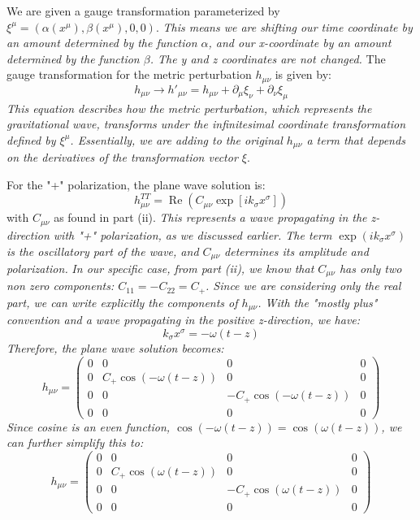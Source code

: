 \documentclass{article}
\begin{document}
We are given a gauge transformation parameterized by $\xi^{\mu} = (\alpha(x^{\mu}), \beta(x^{\mu}), 0, 0)$. \emph{This means we are shifting our time coordinate by an amount determined by the function $\alpha$, and our x-coordinate by an amount determined by the function $\beta$. The y and z coordinates are not changed.} The gauge transformation for the metric perturbation $h_{\mu \nu}$ is given by:
\begin{equation}
h_{\mu \nu} \to h'_{\mu\nu} = h_{\mu \nu} + \partial_{\mu} \xi_{\nu} + \partial_{\nu} \xi_{\mu}
\end{equation}
\emph{This equation describes how the metric perturbation, which represents the gravitational wave, transforms under the infinitesimal coordinate transformation defined by $\xi^{\mu}$. Essentially, we are adding to the original $h_{\mu\nu}$ a term that depends on the derivatives of the transformation vector $\xi$}.

For the "+" polarization, the plane wave solution is:
\begin{equation}
h_{\mu \nu}^{T T} = \operatorname{Re}\left(C_{\mu \nu} \exp \left[i k_{\sigma} x^{\sigma}\right]\right)
\end{equation}
with $C_{\mu \nu}$ as found in part (ii). \emph{This represents a wave propagating in the z-direction with "+" polarization, as we discussed earlier. The term $\exp(ik_{\sigma}x^{\sigma})$ is the oscillatory part of the wave, and $C_{\mu\nu}$ determines its amplitude and polarization.}
\newline
\emph{In our specific case, from part (ii), we know that $C_{\mu\nu}$ has only two non zero components: $C_{11} = -C_{22}=C_{+}$. Since we are considering only the real part, we can write explicitly the components of $h_{\mu\nu}$. With the "mostly plus" convention and a wave propagating in the positive z-direction, we have:}
\begin{equation}
k_{\sigma}x^{\sigma} = -\omega(t-z)
\end{equation}
\emph{Therefore, the plane wave solution becomes:}
\begin{equation}
h_{\mu \nu} = \begin{pmatrix}
0 & 0 & 0 & 0 \\
0 & C_{+}\cos(-\omega(t-z)) & 0 & 0 \\
0 & 0 & -C_{+}\cos(-\omega(t-z)) & 0 \\
0 & 0 & 0 & 0
\end{pmatrix}
\end{equation}
\emph{Since cosine is an even function, $\cos(-\omega(t-z)) = \cos(\omega(t-z))$, we can further simplify this to:}
\begin{equation}
h_{\mu \nu} = \begin{pmatrix}
0 & 0 & 0 & 0 \\
0 & C_{+}\cos(\omega(t-z)) & 0 & 0 \\
0 & 0 & -C_{+}\cos(\omega(t-z)) & 0 \\
0 & 0 & 0 & 0
\end{pmatrix}
\end{equation}
\end{document}
